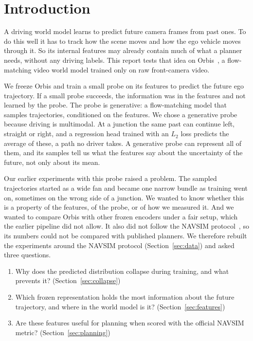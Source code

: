 \section{Introduction}
\label{sec:introduction}

A driving world model learns to predict future camera frames from past ones. To
do this well it has to track how the scene moves and how the ego vehicle moves
through it. So its internal features may already contain much of what a planner
needs, without any driving labels. This report tests that idea on
Orbis~\cite{orbis}, a flow-matching video world model trained only on raw
front-camera video.

We freeze Orbis and train a small probe on its features to predict the future
ego trajectory. If a small probe succeeds, the information was in the features
and not learned by the probe. The probe is generative: a flow-matching model
that samples trajectories, conditioned on the features. We chose a generative
probe because driving is multimodal. At a junction the same past can continue
left, straight or right, and a regression head trained with an $L_2$ loss
predicts the average of these, a path no driver takes. A generative probe can
represent all of them, and its samples tell us what the features say about the
uncertainty of the future, not only about its mean.

Our earlier experiments with this probe raised a problem. The sampled
trajectories started as a wide fan and became one narrow bundle as training went
on, sometimes on the wrong side of a junction. We wanted to know whether this is
a property of the features, of the probe, or of how we measured it. And we
wanted to compare Orbis with other frozen encoders under a fair setup, which the
earlier pipeline did not allow. It also did not follow the NAVSIM
protocol~\cite{navsim1}, so its numbers could not be compared with published
planners. We therefore rebuilt the experiments around the NAVSIM protocol
(Section~\ref{sec:data}) and asked three questions.

\begin{enumerate}[leftmargin=*,itemsep=2pt]
  \item Why does the predicted distribution collapse during training, and what
  prevents it? (Section~\ref{sec:collapse})
  \item Which frozen representation holds the most information about the future
  trajectory, and where in the world model is it? (Section~\ref{sec:features})
  \item Are these features useful for planning when scored with the official
  NAVSIM metric? (Section~\ref{sec:planning})
\end{enumerate}

